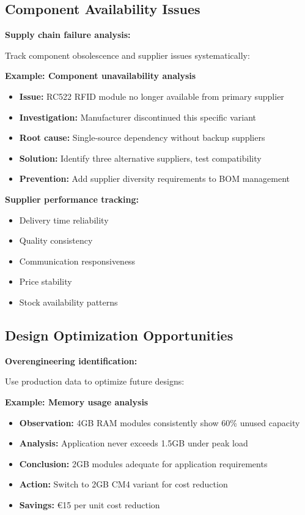 \subsection{Component Availability Issues}

\textbf{Supply chain failure analysis:}

Track component obsolescence and supplier issues systematically:

\textbf{Example: Component unavailability analysis}
\begin{itemize}
\item \textbf{Issue:} RC522 RFID module no longer available from primary supplier
\item \textbf{Investigation:} Manufacturer discontinued this specific variant
\item \textbf{Root cause:} Single-source dependency without backup suppliers
\item \textbf{Solution:} Identify three alternative suppliers, test compatibility
\item \textbf{Prevention:} Add supplier diversity requirements to BOM management
\end{itemize}

\textbf{Supplier performance tracking:}
\begin{itemize}
\item Delivery time reliability
\item Quality consistency
\item Communication responsiveness
\item Price stability
\item Stock availability patterns
\end{itemize}

\subsection{Design Optimization Opportunities}

\textbf{Overengineering identification:}

Use production data to optimize future designs:

\textbf{Example: Memory usage analysis}
\begin{itemize}
\item \textbf{Observation:} 4GB RAM modules consistently show 60\% unused capacity
\item \textbf{Analysis:} Application never exceeds 1.5GB under peak load
\item \textbf{Conclusion:} 2GB modules adequate for application requirements
\item \textbf{Action:} Switch to 2GB CM4 variant for cost reduction
\item \textbf{Savings:} €15 per unit cost reduction
\end{itemize}

